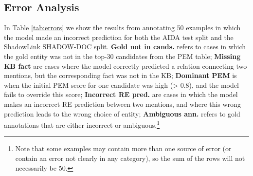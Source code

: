\documentclass[11pt]{article}
\begin{document}
\subsection{Error Analysis}

In Table \ref{tab:errors} we show the results from annotating 50 examples in which the model made an incorrect prediction for both the AIDA test split and the ShadowLink {SHADOW-DOC} split. \textbf{Gold not in cands.} refers to cases in which the gold entity was not in the top-30 candidates from the PEM table; \textbf{Missing KB fact} are cases where the model correctly predicted a relation connecting two mentions, but the corresponding fact was not in the KB; \textbf{Dominant PEM} is when the initial PEM score for one candidate was high (> 0.8), and the model fails to override this score; \textbf{Incorrect RE pred.} are cases in which the model makes an incorrect RE prediction between two mentions, and where this wrong prediction leads to the wrong choice of entity; \textbf{Ambiguous ann.} refers to gold annotations that are either incorrect or ambiguous.\footnote{Note that some examples may contain more than one source of error (or contain an error not clearly in any category), so the sum of the rows will not necessarily be 50.}

\begin{table}[h]
\caption{Counts per error category from 50 annotations on AIDA-CoNLL and ShadowLink-Shadow datasets.}
\label{tab:errors}
\end{table}
\end{document}
